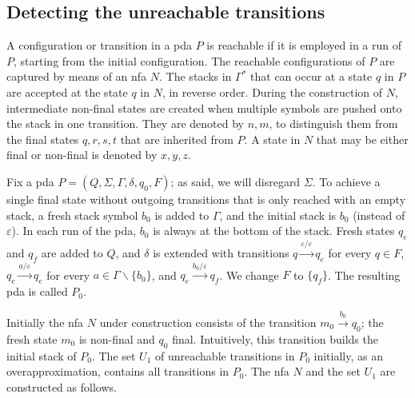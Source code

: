 \documentclass{llncs}
\newcommand{\eps}{\ensuremath{\varepsilon}}
\begin{document}
\subsection{Detecting the unreachable transitions}
\label{sec:forward}

A configuration or transition in a pda $P$ is reachable if it is employed in a run of $P$,
starting from the initial configuration. The reachable configurations of $P$ are captured by means of an nfa $N$.
The stacks in $\Gamma^*$ that can occur at a state $q$ in $P$ are accepted at the state $q$ in $N$,
in reverse order. During the construction of $N$, intermediate non-final states
are created when multiple symbols are pushed onto the stack in one transition.
They are denoted by $n,m$, to distinguish them from the final states $q,r,s,t$ that are
inherited from $P$. A state in $N$ that may be either final or non-final is denoted by $x,y,z$.

Fix a pda $P=(Q, \Sigma, \Gamma, \delta, q_0, F)$; as said, we will disregard $\Sigma$.
To achieve a single final state without outgoing transitions that is only reached with an empty stack, a fresh stack symbol $b_0$
is added to $\Gamma$, and the initial stack is $b_0$ (instead of $\eps$). In each run of the pda, $b_0$ is always at the bottom of the stack.
Fresh states $q_e$ and $q_f$ are added to $Q$, and $\delta$ is extended with transitions $q\stackrel{\eps/\eps}{\rightarrow}q_e$ for every $q\in F$,
$q_e\stackrel{a/\eps}{\rightarrow}q_e$ for every $a\in\Gamma\backslash\{b_0\}$, and $q_e\stackrel{b_0/\eps}{\rightarrow}q_f$.
We change $F$ to $\{q_f\}$. The resulting pda is called $P_0$.

Initially the nfa $N$ under construction consists of the transition $m_0\stackrel{b_0}{\rightarrow}q_0$;
the fresh state $m_0$ is non-final and $q_0$ final. Intuitively, this transition builds the initial stack of $P_0$.
The set $U_1$ of unreachable transitions in $P_0$ initially, as an overapproximation, contains all transitions in $P_0$.
The nfa $N$ and the set $U_1$ are constructed as follows.

\vspace{1.5mm}
\end{document}

